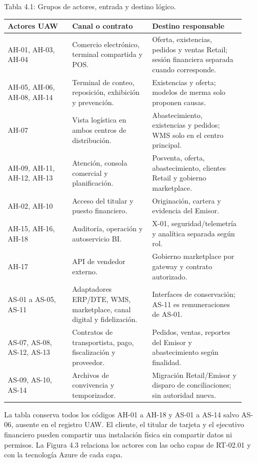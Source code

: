 \documentclass[11pt]{article}
\begin{document}
Tabla 4.1: Grupos de actores, entrada y destino lógico.\par\nopagebreak
\begin{longtable}{@{}p{0.25\linewidth}p{0.31\linewidth}p{0.36\linewidth}@{}}
\toprule Actores UAW & Canal o contrato & Destino responsable \\
\midrule\endhead\bottomrule\endlastfoot
AH-01, AH-03, AH-04 & Comercio electrónico, terminal compartida y POS. & Oferta, existencias, pedidos y ventas Retail; sesión financiera separada cuando corresponde. \\
AH-05, AH-06, AH-08, AH-14 & Terminal de conteo, reposición, exhibición y prevención. & Existencias y oferta; modelos de merma solo proponen causas. \\
AH-07 & Vista logística en ambos centros de distribución. & Abastecimiento, existencias y pedidos; WMS solo en el centro principal. \\
AH-09, AH-11, AH-12, AH-13 & Atención, consola comercial y planificación. & Posventa, oferta, abastecimiento, clientes Retail y gobierno marketplace. \\
AH-02, AH-10 & Acceso del titular y puesto financiero. & Originación, cartera y evidencia del Emisor. \\
AH-15, AH-16, AH-18 & Auditoría, operación y autoservicio BI. & X-01, seguridad/telemetría y analítica separada según rol. \\
AH-17 & API de vendedor externo. & Gobierno marketplace por gateway y contrato autorizado. \\
AS-01 a AS-05, AS-11 & Adaptadores ERP/DTE, WMS, marketplace, canal digital y fidelización. & Interfaces de conservación; AS-11 es remuneraciones de AS-01. \\
AS-07, AS-08, AS-12, AS-13 & Contratos de transportista, pago, fiscalización y proveedor. & Pedidos, ventas, reportes del Emisor y abastecimiento según finalidad. \\
AS-09, AS-10, AS-14 & Archivos de convivencia y temporizador. & Migración Retail/Emisor y disparo de conciliaciones; sin autoridad nueva. \\
\end{longtable}

La tabla conserva todos los códigos AH-01 a AH-18 y AS-01 a AS-14 salvo AS-06, ausente en el registro UAW. El cliente, el titular de tarjeta y el ejecutivo financiero pueden compartir una instalación física sin compartir datos ni permisos. La Figura 4.3 relaciona los actores con las ocho capas de RT-02.01 y con la tecnología Azure de cada capa.
\end{document}
